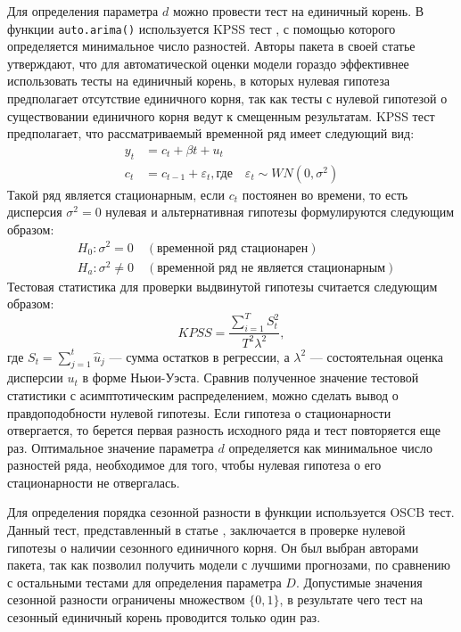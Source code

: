 Для определения параметра $d$ можно провести тест на единичный корень. В функции \texttt{auto.arima()} используется KPSS тест , с помощью которого определяется минимальное число разностей. Авторы пакета в своей статье  утверждают, что  для автоматической оценки модели гораздо эффективнее использовать тесты на единичный корень, в которых нулевая гипотеза предполагает отсутствие единичного корня, так как тесты с нулевой гипотезой о существовании единичного корня ведут к смещенным результатам. KPSS тест предполагает, что рассматриваемый временной ряд имеет следующий вид:
\begin{align*}
y_t &= c_t + \beta t + u_t\\
c_t &= c_{t-1} + \varepsilon_t, \text{где}\quad \varepsilon_t \sim WN(0,\sigma^2)
\end{align*}
Такой ряд является стационарным, если $c_t$ постоянен во времени, то есть дисперсия $\sigma^2 = 0$ нулевая и альтернативная гипотезы формулируются следующим образом:
\begin{align*}
&H_0: \sigma^2 = 0\quad (\text{временной ряд стационарен})\\
&H_a: \sigma^2 \neq 0 \quad (\text{временной ряд не является стационарным})
\end{align*}
Тестовая статистика для проверки выдвинутой гипотезы считается следующим образом:
\begin{equation*}
KPSS = \frac{\sum_{i=1}^{T}S_t^2}{T^2 \lambda^2},
\end{equation*}
где $S_t = \sum_{j=1}^{t} \hat{u}_j$ --- сумма остатков в регрессии, а $\lambda^2$ --- состоятельная оценка дисперсии $u_t$ в форме Ньюи-Уэста. Сравнив полученное значение тестовой статистики с асимптотическим распределением, можно сделать вывод о правдоподобности нулевой гипотезы. Если гипотеза о стационарности отвергается, то берется первая разность исходного ряда и тест повторяется еще раз. Оптимальное значение параметра $d$ определяется как минимальное число разностей ряда, необходимое для того, чтобы нулевая гипотеза о его стационарности не отвергалась.

Для определения порядка сезонной разности в функции  используется OSCB тест. Данный тест, представленный в статье , заключается в проверке нулевой гипотезы о наличии сезонного единичного корня. Он был выбран авторами пакета, так как позволил получить модели с лучшими прогнозами, по сравнению с остальными тестами для определения параметра $D$. Допустимые значения сезонной разности ограничены множеством $\{0,1\}$, в результате чего тест на сезонный единичный корень проводится только один раз.

